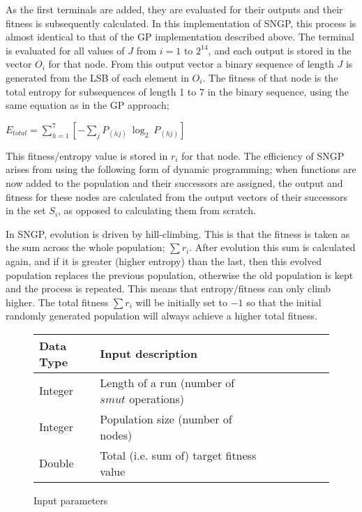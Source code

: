 \documentclass[a4paper,10.5pt]{article}
\begin{document}
As the first terminals are added, they are evaluated for their outputs and their fitness is subsequently calculated. In this implementation of SNGP, this process is almost identical to that of the GP implementation described above. The terminal is evaluated for all values of $J$ from $i = 1$ to $2^{14}$, and each output is stored in the vector $O_i$ for that node. From this output vector a binary sequence of length $J$ is generated from the LSB of each element in $O_i$. The fitness of that node is the total entropy for subsequences of length 1 to 7 in the binary sequence, using the same equation as in the GP approach;
\begin{center}
 $E_{total} = \sum_{h = 1}^{7} \left[ - \sum_{j} P_{(hj)}\ \log_2\ P_{(hj)} \right]$
\end{center} 

This fitness/entropy value is stored in $r_i$ for that node. The efficiency of SNGP arises from using the following form of dynamic programming; when functions are now added to the population and their successors are assigned, the output and fitness for these nodes are calculated from the output vectors of their successors in the set $S_i$, as opposed to calculating them from scratch.

In SNGP, evolution is driven by hill-climbing. This is that the fitness is taken as the sum across the whole population; $\sum r_i$. After evolution this sum is calculated again, and if it is greater (higher entropy) than the last, then this evolved population replaces the previous population, otherwise the old population is kept and the process is repeated. This means that entropy/fitness can only climb higher. The total fitness $\sum r_i$ will be initially set to $-1$ so that the initial randomly generated population will always achieve a higher total fitness.

\begin{figure}[H]
\centering
\caption{Input parameters}
\label{inputparamsngp}
\begin{tabular}{l*{6}{l}r}
Data Type             & Input description\\
\hline
Integer & Length of a run (number of $smut$ operations)\\
Integer & Population size (number of nodes)\\
Double & Total (i.e. sum of) target fitness value\\
\end{tabular}
\end{figure}
\end{document}
